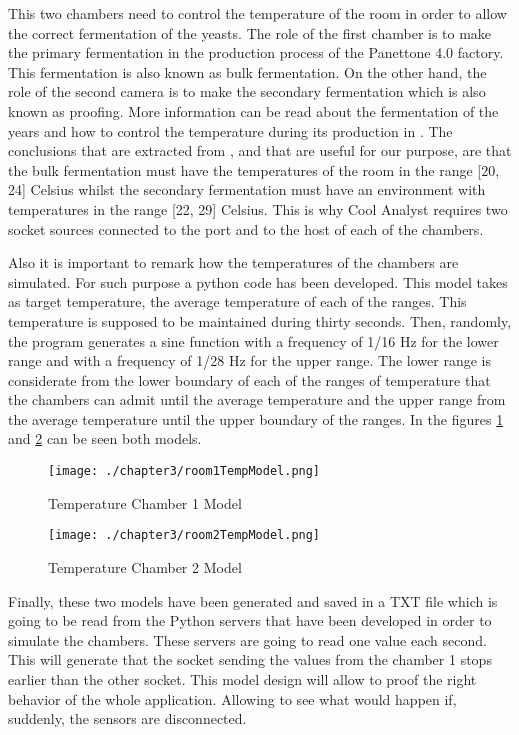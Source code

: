 This two chambers need to control the temperature of the room in order to allow the correct fermentation of the yeasts. The role of the first chamber is to make the primary fermentation in the production process of the Panettone 4.0 factory. This fermentation is also known as bulk fermentation. On the other hand, the role of the second camera is to make the secondary fermentation which is also known as proofing. More information can be read about the fermentation of the years and how to control the temperature during its production in \cite{yeastfermentation}. The conclusions that are extracted from \cite{yeastfermentation}, and that are useful for our purpose, are that the bulk fermentation must have the temperatures of the room in the range [20, 24] Celsius whilst the secondary fermentation must have an environment with temperatures in the range [22, 29] Celsius. This is why Cool Analyst requires two socket sources connected to the port and to the host of each of the chambers.

Also it is important to remark how the temperatures of the chambers are simulated. For such purpose a python code has been developed. This model takes as target temperature, the average temperature of each of the ranges. This temperature is supposed to be maintained during thirty seconds. Then, randomly, the program generates a sine function with a frequency of 1/16 Hz for the lower range and with a frequency of 1/28 Hz for the upper range. The lower range is considerate from the lower boundary of each of the ranges of temperature that the chambers can admit until the average temperature and the upper range from the average temperature until the upper boundary of the ranges. In the figures \ref{fig:Temperature Chamber 1 Model} and \ref{fig:Temperature Chamber 2 Model} can be seen both models.

\begin{figure}
\centering
{\texttt{[image: ./chapter3/room1TempModel.png]}}
\caption{Temperature Chamber 1 Model}
\label{fig:Temperature Chamber 1 Model}
\end{figure}

\begin{figure}
\centering
{\texttt{[image: ./chapter3/room2TempModel.png]}}
\caption{Temperature Chamber 2 Model}
\label{fig:Temperature Chamber 2 Model}
\end{figure}

Finally, these two models have been generated and saved in a TXT file which is going to be read from the Python servers that have been developed in order to simulate the chambers. These servers are going to read one value each second. This will generate that the socket sending the values from the chamber 1 stops earlier than the other socket. This model design will allow to proof the right behavior of the whole application. Allowing to see what would happen if, suddenly, the sensors are disconnected.


